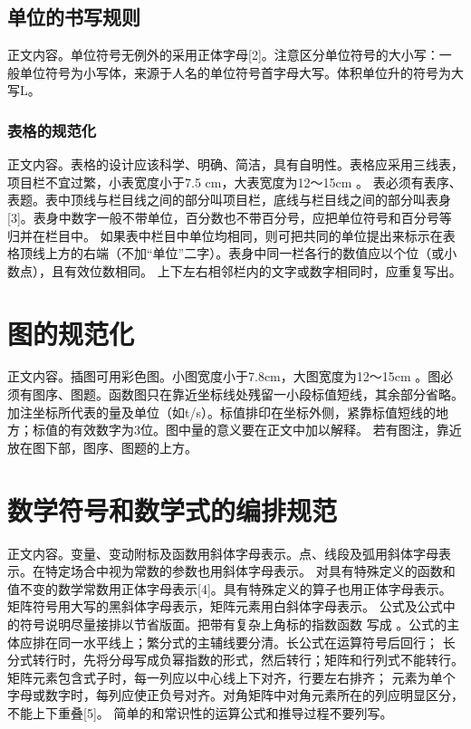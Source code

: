 \documentclass[a4paper, zihao=5, UTF8, AutoFakeBold, AutoFakeSlant]{ctexart}
\numberwithin{equation}{section}
\numberwithin{figure}{section}
\numberwithin{table}{section}
\begin{document}
\subsection{单位的书写规则}
正文内容。单位符号无例外的采用正体字母[2]。注意区分单位符号的大小写：一般单位符号为小写体，来源于人名的单位符号首字母大写。体积单位升的符号为大写L。

\subsubsection{表格的规范化}
正文内容。表格的设计应该科学、明确、简洁，具有自明性。表格应采用三线表，项目栏不宜过繁，小表宽度小于7.5 cm，大表宽度为12～15cm 。
表必须有表序、表题。表中顶线与栏目线之间的部分叫项目栏，底线与栏目线之间的部分叫表身[3]。表身中数字一般不带单位，百分数也不带百分号，应把单位符号和百分号等归并在栏目中。
如果表中栏目中单位均相同，则可把共同的单位提出来标示在表格顶线上方的右端（不加“单位”二字）。表身中同一栏各行的数值应以个位（或小数点），且有效位数相同。
上下左右相邻栏内的文字或数字相同时，应重复写出。

\section{图的规范化}
正文内容。插图可用彩色图。小图宽度小于7.8cm，大图宽度为12～15cm 。图必须有图序、图题。函数图只在靠近坐标线处残留一小段标值短线，其余部分省略。
加注坐标所代表的量及单位（如t/s）。标值排印在坐标外侧，紧靠标值短线的地方；标值的有效数字为3位。图中量的意义要在正文中加以解释。
若有图注，靠近放在图下部，图序、图题的上方。

\section{数学符号和数学式的编排规范}
正文内容。变量、变动附标及函数用斜体字母表示。点、线段及弧用斜体字母表示。在特定场合中视为常数的参数也用斜体字母表示。
对具有特殊定义的函数和值不变的数学常数用正体字母表示[4]。具有特殊定义的算子也用正体字母表示。矩阵符号用大写的黑斜体字母表示，矩阵元素用白斜体字母表示。\paaf
公式及公式中的符号说明尽量接排以节省版面。把带有复杂上角标的指数函数 写成 。公式的主体应排在同一水平线上；繁分式的主辅线要分清。长公式在运算符号后回行；
长分式转行时，先将分母写成负幂指数的形式，然后转行；矩阵和行列式不能转行。矩阵元素包含式子时，每一列应以中心线上下对齐，行要左右排齐；
元素为单个字母或数字时，每列应使正负号对齐。对角矩阵中对角元素所在的列应明显区分，不能上下重叠[5]。\paaf
简单的和常识性的运算公式和推导过程不要列写。\paaf
\end{document}
